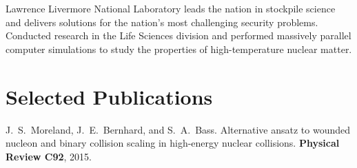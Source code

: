 \documentclass[letterpaper,10pt]{article}
\begin{document}
\begin{multicols}{2}
Lawrence Livermore National Laboratory leads the nation in stockpile science and delivers solutions for the nation's most challenging security problems. Conducted research in the Life Sciences division and performed massively parallel computer simulations to study the properties of high-temperature nuclear matter.

\section{Selected Publications}

J.\ S.\ Moreland, J.\ E.\ Bernhard, and S.\ A.\ Bass. Alternative ansatz to wounded nucleon and binary collision scaling in high-energy nuclear collisions.
\textbf{Physical Review C92}, 2015.

\vfill

\end{multicols}
\end{document}
